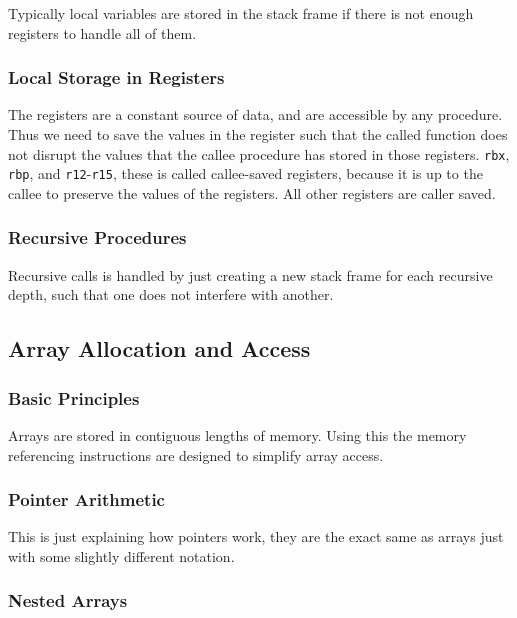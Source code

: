 \documentclass[10pt]{armath}
\newcommand{\s}[1]{\texttt{#1}}
\begin{document}
Typically local variables are stored in the stack frame if there is not enough
registers to handle all of them.

\subsubsection{Local Storage in Registers}%
\label{ssub:local_storage_in_registers}

The registers are a constant source of data, and are accessible by any
procedure. Thus we need to save the values in the register such that the called
function does not disrupt the values that the callee procedure has stored in
those registers. \s{rbx}, \s{rbp}, and \s{r12}-\s{r15}, these is called
callee-saved registers, because it is up to the callee to preserve the values
of the registers. All other registers are caller saved.

\subsubsection{Recursive Procedures}%
\label{ssub:recursive_procedures}

Recursive calls is handled by just creating a new stack frame for each
recursive depth, such that one does not interfere with another.

\subsection{Array Allocation and Access}%
\label{sub:array_allocation_and_access}

\subsubsection{Basic Principles}%
\label{ssub:basic_principles}

Arrays are stored in contiguous lengths of memory. Using this the memory
referencing instructions are designed to simplify array access.

\subsubsection{Pointer Arithmetic}%
\label{ssub:pointer_arithmetic}

This is just explaining how pointers work, they are the exact same as arrays
just with some slightly different notation.

\subsubsection{Nested Arrays}%
\label{ssub:nested_arrays}
\end{document}

